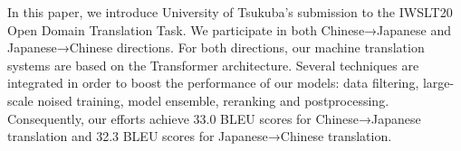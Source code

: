 In this paper, we introduce University of Tsukuba's submission to the IWSLT20 Open Domain Translation Task. We participate in both Chinese→Japanese and Japanese→Chinese directions. For both directions, our machine translation systems are based on the Transformer architecture. Several techniques are integrated in order to boost the performance of our models: data filtering, large-scale noised training, model ensemble, reranking and postprocessing. Consequently, our efforts achieve 33.0 BLEU scores for Chinese→Japanese translation and 32.3 BLEU scores for Japanese→Chinese translation.
